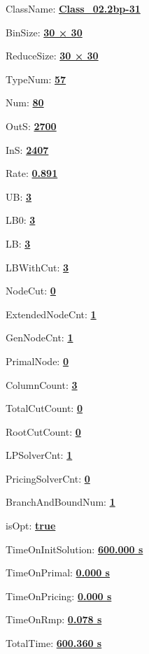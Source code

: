 \documentclass[11pt]{article}
\begin{document}
\pagestyle{empty}


ClassName: \underline{\textbf{Class_02.2bp-31}}
\par
BinSize: \underline{\textbf{30 × 30}}
\par
ReduceSize: \underline{\textbf{30 × 30}}
\par
TypeNum: \underline{\textbf{57}}
\par
Num: \underline{\textbf{80}}
\par
OutS: \underline{\textbf{2700}}
\par
InS: \underline{\textbf{2407}}
\par
Rate: \underline{\textbf{0.891}}
\par
UB: \underline{\textbf{3}}
\par
LB0: \underline{\textbf{3}}
\par
LB: \underline{\textbf{3}}
\par
LBWithCut: \underline{\textbf{3}}
\par
NodeCut: \underline{\textbf{0}}
\par
ExtendedNodeCnt: \underline{\textbf{1}}
\par
GenNodeCnt: \underline{\textbf{1}}
\par
PrimalNode: \underline{\textbf{0}}
\par
ColumnCount: \underline{\textbf{3}}
\par
TotalCutCount: \underline{\textbf{0}}
\par
RootCutCount: \underline{\textbf{0}}
\par
LPSolverCnt: \underline{\textbf{1}}
\par
PricingSolverCnt: \underline{\textbf{0}}
\par
BranchAndBoundNum: \underline{\textbf{1}}
\par
isOpt: \underline{\textbf{true}}
\par
TimeOnInitSolution: \underline{\textbf{600.000 s}}
\par
TimeOnPrimal: \underline{\textbf{0.000 s}}
\par
TimeOnPricing: \underline{\textbf{0.000 s}}
\par
TimeOnRmp: \underline{\textbf{0.078 s}}
\par
TotalTime: \underline{\textbf{600.360 s}}
\par
\newpage
\end{document}
